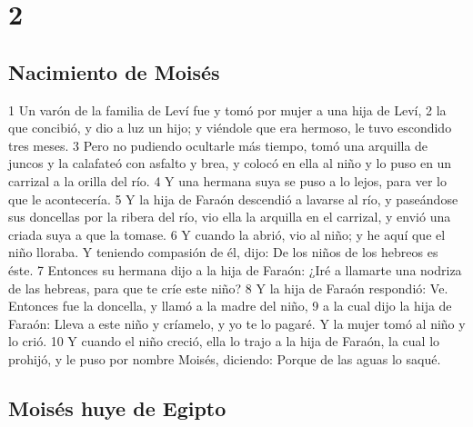 \chapter{2}

\section*{Nacimiento de Moisés}

1 Un varón de la familia de Leví fue y tomó por mujer a una hija de Leví,
2 la que concibió, y dio a luz un hijo; y viéndole que era hermoso, le tuvo escondido tres meses.
3 Pero no pudiendo ocultarle más tiempo, tomó una arquilla de juncos y la calafateó con asfalto y brea, y colocó en ella al niño y lo puso en un carrizal a la orilla del río.
4 Y una hermana suya se puso a lo lejos, para ver lo que le acontecería.
5 Y la hija de Faraón descendió a lavarse al río, y paseándose sus doncellas por la ribera del río, vio ella la arquilla en el carrizal, y envió una criada suya a que la tomase.
6 Y cuando la abrió, vio al niño; y he aquí que el niño lloraba. Y teniendo compasión de él, dijo: De los niños de los hebreos es éste.
7 Entonces su hermana dijo a la hija de Faraón: ¿Iré a llamarte una nodriza de las hebreas, para que te críe este niño?
8 Y la hija de Faraón respondió: Ve. Entonces fue la doncella, y llamó a la madre del niño,
9 a la cual dijo la hija de Faraón: Lleva a este niño y críamelo, y yo te lo pagaré. Y la mujer tomó al niño y lo crió.
10 Y cuando el niño creció, ella lo trajo a la hija de Faraón, la cual lo prohijó, y le puso por nombre Moisés, diciendo: Porque de las aguas lo saqué.

\section*{Moisés huye de Egipto}

